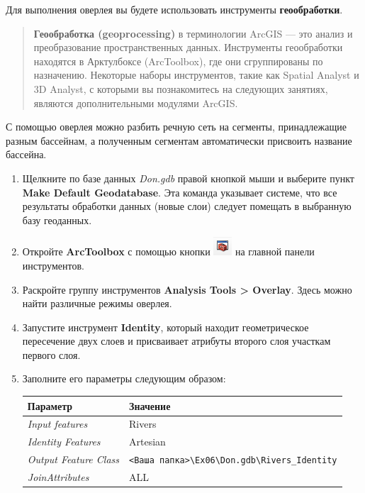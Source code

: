 \documentclass[]{book}
\theoremstyle{definition}
\theoremstyle{definition}
\theoremstyle{definition}
\theoremstyle{remark}
\begin{document}
Для выполнения оверлея вы будете использовать инструменты
\textbf{геообработки}.

\begin{quote}
\textbf{Геообработка (geoprocessing)} в терминологии ArcGIS --- это
анализ и преобразование пространственных данных. Инструменты
геообработки находятся в Арктулбоксе (ArcToolbox), где они сгруппированы
по назначению. Некоторые наборы инструментов, такие как Spatial Analyst
и 3D Analyst, с которыми вы познакомитесь на следующих занятиях,
являются дополнительными модулями ArcGIS.
\end{quote}

С помощью оверлея можно разбить речную сеть на сегменты, принадлежащие
разным бассейнам, а полученным сегментам автоматически присвоить
название бассейна.

\begin{enumerate}
\def\labelenumi{\arabic{enumi}.}
\item
  Щелкните по базе данных \emph{Don.gdb} правой кнопкой мыши и выберите
  пункт \textbf{Make Default Geodatabase}. Эта команда указывает
  системе, что все результаты обработки данных (новые слои) следует
  помещать в выбранную базу геоданных.
\item
  Откройте \textbf{ArcToolbox} с помощью кнопки
  \includegraphics{images/Ex06/image19.png} на главной панели
  инструментов.
\item
  Раскройте группу инструментов \textbf{Analysis Tools \textgreater{}
  Overlay}. Здесь можно найти различные режимы оверлея.
\item
  Запустите инструмент \textbf{Identity}, который находит геометрическое
  пересечение двух слоев и присваивает атрибуты второго слоя участкам
  первого слоя.
\item
  Заполните его параметры следующим образом:

  \begin{longtable}[]{@{}ll@{}}
  \toprule
  Параметр & Значение\tabularnewline
  \midrule
  \endhead
  \emph{Input features} & Rivers\tabularnewline
  \emph{Identity Features} & Artesian\tabularnewline
  \emph{Output Feature Class} &
  \texttt{\textless{}Ваша\ папка\textgreater{}\textbackslash{}Ex06\textbackslash{}Don.gdb\textbackslash{}Rivers\_Identity}\tabularnewline
  \emph{JoinAttributes} & ALL\tabularnewline
  \bottomrule
  \end{longtable}


\end{enumerate}
\end{document}
